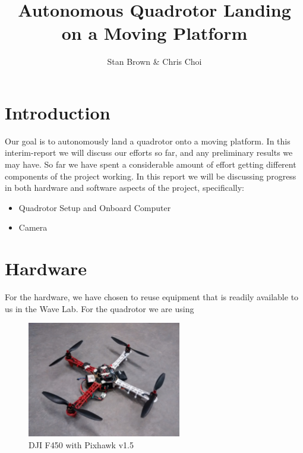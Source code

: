 \documentclass{article}[12pt]
\begin{document}
\title{Autonomous Quadrotor Landing on a Moving Platform}
\author{Stan Brown \& Chris Choi}
\date{}
\maketitle

\section*{Introduction}
Our goal is to autonomously land a quadrotor onto a moving platform. In this 
interim-report we will discuss our efforts so far, and any preliminary results 
we may have. So far we have spent a considerable amount of effort getting 
different components of the project working. In this report we will be 
discussing progress in both hardware and software aspects of the project, 
specifically:

\begin{itemize}
	\vspace{-0.4cm}
	\setlength{\itemsep}{0pt}
	\setlength{\parskip}{0pt}
	\setlength{\parsep}{0pt}
	
	\item{Quadrotor Setup and Onboard Computer}
	\item{Camera}
\end{itemize}



\section*{Hardware}
For the hardware, we have chosen to reuse equipment that is readily available 
to us in the Wave Lab. For the quadrotor we are using 


\begin{figure}[H]
	\centering
	\includegraphics[width=0.6\textwidth]{images/quadrotor.jpg}
	\caption{DJI F450 with Pixhawk v1.5}
\end{figure}
\end{document}
